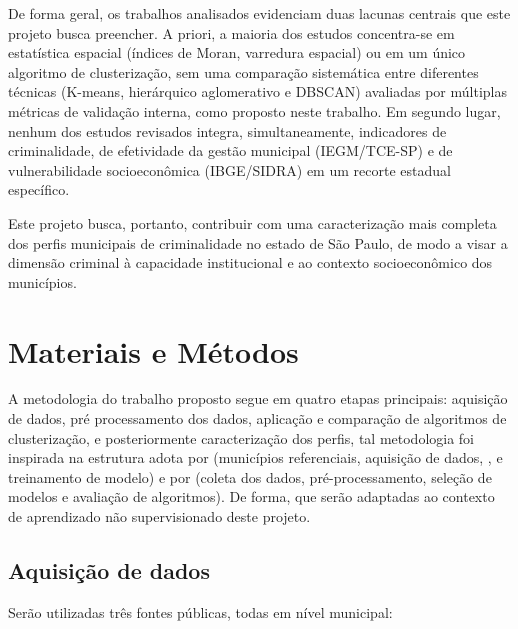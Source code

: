 \documentclass[12pt]{article}
\begin{document}
De forma geral, os trabalhos analisados evidenciam duas lacunas centrais que este projeto busca preencher. A priori, a maioria dos estudos concentra-se em estatística espacial (índices de Moran, varredura espacial) ou em um único algoritmo de clusterização, sem uma comparação sistemática entre diferentes técnicas (K-means, hierárquico aglomerativo e DBSCAN) avaliadas por múltiplas métricas de validação interna, como proposto neste trabalho. Em segundo lugar, nenhum dos estudos revisados integra, simultaneamente, indicadores de criminalidade, de efetividade da gestão municipal (IEGM/TCE-SP) e de vulnerabilidade socioeconômica (IBGE/SIDRA) em um recorte estadual específico. 

Este projeto busca, portanto, contribuir com uma caracterização mais completa dos perfis municipais de criminalidade no estado de São Paulo, de modo a visar a dimensão criminal à capacidade institucional e ao contexto socioeconômico dos municípios.


\section{Materiais e Métodos}
A metodologia do trabalho proposto segue em quatro etapas principais: aquisição de dados, pré processamento dos dados, aplicação e comparação de algoritmos de clusterização, e posteriormente caracterização dos perfis, tal  metodologia foi inspirada na estrutura adota por \cite{silva2025} (municípios referenciais, aquisição de dados, , e treinamento de modelo) e por \cite{soliani2024} (coleta dos dados, pré-processamento, seleção de modelos e avaliação de algoritmos). De forma, que serão adaptadas ao contexto de aprendizado não supervisionado deste projeto.

\subsection{Aquisição de dados}

Serão utilizadas três fontes públicas, todas em nível municipal:
\end{document}
